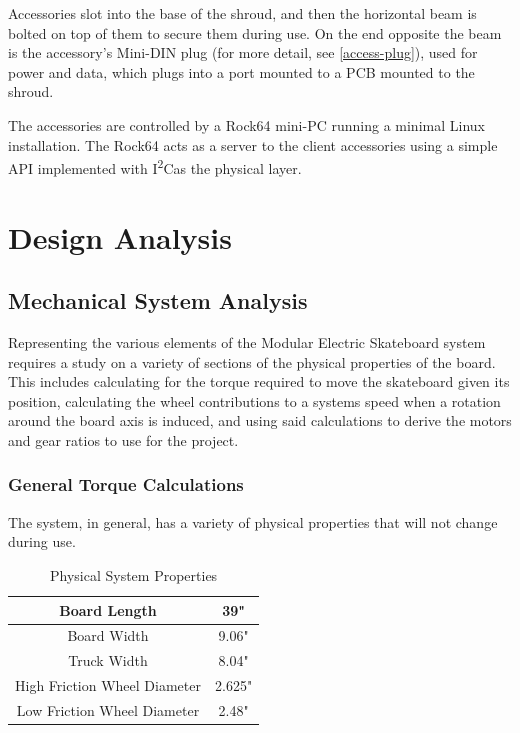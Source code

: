 \documentclass[titlepage, letterpaper,12pt]{article}
\newcommand{\itwoc}{I\textsuperscript{2}C}
\begin{document}
Accessories slot into the base of the shroud, and then the horizontal beam is bolted on top of them to secure them during use. On the end opposite the beam is the accessory's Mini-DIN plug (for more detail, see \ref{access-plug}), used for power and data, which plugs into a port mounted to a PCB mounted to the shroud.

The accessories are controlled by a Rock64 mini-PC running a minimal Linux installation. The Rock64 acts as a server to the client accessories using a simple API implemented with \itwoc as the physical layer.

\newpage
\section{Design Analysis}

\subsection{Mechanical System Analysis}
Representing the various elements of the Modular Electric Skateboard system requires a study on a variety of sections of the physical properties of the board. This includes calculating for the torque required to move the skateboard given its position, calculating the wheel contributions to a systems speed when a rotation around the board axis is induced, and using said calculations to derive the motors and gear ratios to use for the project.
\subsubsection{General Torque Calculations}
The system, in general, has a variety of physical properties that will not change during use.

\begin{table}[h]
\caption{Physical System Properties}
\begin{center}
 \begin{tabular}{||c c||}
 \hline
 Board Length & 39" \\
 \hline
 Board Width & 9.06" \\
 \hline
 Truck Width & 8.04" \\
 \hline
 High Friction Wheel Diameter & 2.625" \\
 \hline
 Low Friction Wheel Diameter & 2.48" \\
 \hline
\end{tabular}
\end{center}
\label{table:phys}
\end{table}
\end{document}
